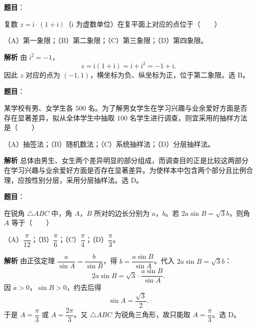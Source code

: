 
\begin{answer}

\textbf{题目}：

复数 $z=\mathrm i\cdot(1+\mathrm i)$（$\mathrm i$ 为虚数单位）在复平面上对应的点位于\mbox{（　　）}

（A）第一象限；（B）第二象限；（C）第三象限；（D）第四象限。

\textbf{解析}
由 $\mathrm i^2=-1$，
\nopagebreak[4]
\[z=\mathrm i(1+\mathrm i)=\mathrm i+\mathrm i^2=-1+\mathrm i.\]
因此 $z$ 对应的点为 $(-1,1)$，横坐标为负、纵坐标为正，位于第二象限。选 B。


\end{answer}
\begin{answer}

\textbf{题目}：

某学校有男、女学生各 $500$ 名。为了解男女学生在学习兴趣与业余爱好方面是否存在显著差异，拟从全体学生中抽取 $100$ 名学生进行调查，则宜采用的抽样方法是\mbox{（　　）}

（A）抽签法；（B）随机数法；（C）系统抽样法；（D）分层抽样法。

\textbf{解析}
总体由男生、女生两个差异明显的部分组成，而调查目的正是比较这两部分在学习兴趣与业余爱好方面是否存在显著差异。为使样本中包含两个部分且比例合理，应按性别分层，采用分层抽样法。选 D。


\end{answer}
\begin{answer}

\textbf{题目}：

在锐角 $\triangle ABC$ 中，角 $A$，$B$ 所对的边长分别为 $a$，$b$。若 $2a\sin B=\sqrt3b$，则角 $A$ 等于\mbox{（　　）}

（A）$\dfrac{\pi}{12}$；（B）$\dfrac{\pi}{6}$；（C）$\dfrac{\pi}{4}$；（D）$\dfrac{\pi}{3}$。

\textbf{解析}
由正弦定理 $\dfrac{a}{\sin A}=\dfrac{b}{\sin B}$，得 $b=\dfrac{a\sin B}{\sin A}$。代入 $2a\sin B=\sqrt3b$：
\nopagebreak[4]
\[2a\sin B=\sqrt3\cdot\frac{a\sin B}{\sin A}.\]
因 $a>0$，$\sin B>0$，约去后得
\nopagebreak[4]
\[\sin A=\frac{\sqrt3}{2}.\]
于是 $A=\dfrac\pi3$ 或 $A=\dfrac{2\pi}{3}$。又 $\triangle ABC$ 为锐角三角形，故只能取 $A=\dfrac\pi3$。选 D。


\end{answer}
